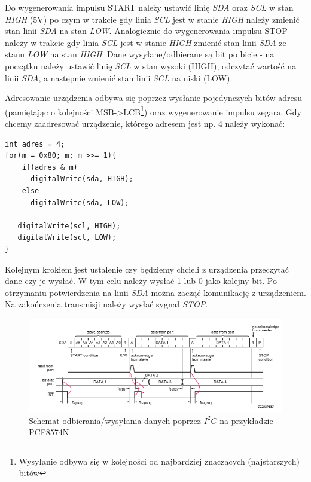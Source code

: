 \documentclass{xmgr}
\begin{document}
Do wygenerowania impulsu START należy ustawić linię \emph{SDA} oraz \emph{SCL} w stan \emph{HIGH} (5V) po czym w trakcie gdy linia \emph{SCL} jest w stanie \emph{HIGH} należy zmienić stan linii \emph{SDA} na stan \emph{LOW}. Analogicznie do wygenerowania impulsu STOP należy w trakcie gdy linia \emph{SCL} jest w stanie \emph{HIGH} zmienić stan linii \emph{SDA} ze stanu \emph{LOW} na stan \emph{HIGH}. Dane wysyłane/odbierane są bit po bicie - na początku należy ustawić linię \emph{SCL} w stan wysoki (HIGH), odczytać wartość na linii \emph{SDA}, a następnie zmienić stan linii \emph{SCL} na niski (LOW).

Adresowanie urządzenia odbywa się poprzez wysłanie pojedynczych bitów adresu (pamiętając o kolejności MSB->LCB\footnote{Wysyłanie odbywa się w kolejności od najbardziej znaczących (najstarszych) bitów}) oraz wygenerowanie impulsu zegara. Gdy chcemy zaadresować urządzenie, którego adresem jest np. 4 należy wykonać:
\begin{lstlisting}[label=bot-dirs-alg,caption=Własna wersja adresowania urządzenia $I^2C$ na przykładzie PCF8574N]
int adres = 4;
for(m = 0x80; m; m >>= 1){
    if(adres & m)         
      digitalWrite(sda, HIGH);
    else
      digitalWrite(sda, LOW);
        
   digitalWrite(scl, HIGH);
   digitalWrite(scl, LOW); 
}
\end{lstlisting}

Kolejnym krokiem jest ustalenie czy będziemy chcieli z urządzenia przeczytać dane czy je wysłać. W tym celu należy wysłać 1 lub 0  jako kolejny bit. Po otrzymaniu potwierdzenia na linii \emph{SDA} można zacząć komunikację z urządzeniem. Na zakończenia transmisji należy wysłać sygnał \emph{STOP}.

\begin{figure}[!h]
    \centering
    \includegraphics[height=0.25\textheight]{images/read_i2c.png}
    \caption{Schemat odbierania/wysyłania danych poprzez $I^2C$ na przykładzie PCF8574N\label{$I^2C$}}
\end{figure}
\end{document}
